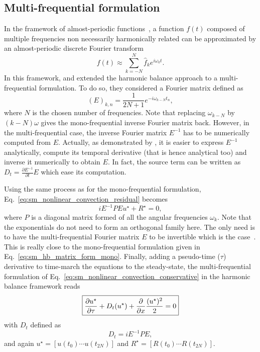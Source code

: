 \subsection{Multi-frequential formulation}
\label{sec:sm_hb_multi}
In the
framework of almost-periodic functions~\cite{Besicovitch1932},
a function $f(t)$ composed of multiple
frequencies non necessarily harmonically related can be approximated
by an almost-periodic
discrete Fourier transform
\begin{equation}
	f(t) \approx \sum_{k=-N}^{N} \widehat{f}_k 
	e^{i \omega_k t}.
\end{equation}
In this framework, \citet{Gopinath2007} and \citet{Ekici2007} 
extended the harmonic balance approach to
a multi-frequential formulation. To do so, they considered
a Fourier matrix defined as
\begin{equation}
	(E)_{k,n} = \frac{1}{2N+1} e^{-i \omega_{k-N} t_n},
\end{equation}
where $N$ is the chosen number of frequencies.
Note that replacing $\omega_{k-N}$ by $(k - N) \omega$ gives
the mono-frequential inverse Fourier matrix back. 
However, in the multi-frequential case, the inverse Fourier matrix
$E^{-1}$ has to be numerically computed from $E$. Actually, as demonstrated by 
\citet{Gopinath2007}, it is easier to express $E^{-1}$ analytically,
compute its temporal derivative (that is hence analytical too) 
and inverse it numerically to obtain $E$. In fact, the source term
can be written as $D_t = \frac{\partial E^{-1}}{\partial t} E$
which ease its computation.

Using the same process as for the mono-frequential formulation,
Eq.~\eqref{eq:sm_nonlinear_convection_residual} becomes
\begin{equation}
	i E^{-1} P E u^\star + R^\star = 0,
\end{equation}
where $P$ is a diagonal matrix formed of all the angular frequencies $\omega_k$.
Note that the exponentials do not need to form an
orthogonal family here. The only need is to have the multi-frequential
Fourier matrix $E$ to be invertible which is the case~\cite{Ekici2007}.
This is really close to the mono-frequential formulation given
in Eq.~\eqref{eq:sm_hb_matrix_form_mono}.
Finally, adding a pseudo-time ($\tau$) derivative 
to time-march the equations to the steady-state,
the multi-frequential formulation of 
Eq.~\eqref{eq:sm_nonlinear_convection_conservative} in the harmonic
balance framework reads
\begin{equation}
	\fbox{$
	\displaystyle \frac{\partial u^\star}{\partial \tau} +
	D_t (u^\star) + 
	\displaystyle \frac{\partial}{\partial x}
		\frac{(u^\star)^2}{2} = 0
	$}
	\label{eq:sm_multi_hb_equ}
\end{equation}
with $D_t$ defined as
\begin{equation}
	D_t = i E^{-1} P E,
	\label{eq:sm_multi_spectral_operator}
\end{equation}
and again $u^\star = [u(t_0) \cdots u(t_{2N})]$ 
and $R^\star = [R(t_0) \cdots R(t_{2N})]$.

